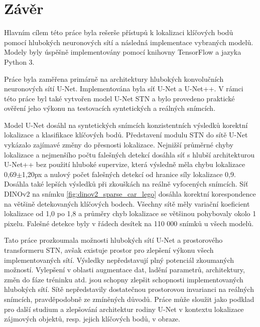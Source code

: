 \chapter{Závěr}
\label{sec:Chapter7}
Hlavním cílem této práce byla rešerše přístupů k lokalizaci klíčových bodů pomocí hlubokých neuronových sítí a následná implementace vybraných modelů. Modely byly úspěšně implementovány pomocí knihovny TensorFlow a jazyka Python 3.

Práce byla zaměřena primárně na architektury hlubokých konvolučních neuronových sítí U-Net. Implementována byla síť U-Net a U-Net++. V rámci této práce byl také vytvořen model U-Net STN a bylo provedeno praktické ověření jeho výkonu na testovacích syntetických a reálných snímcích.

Model U-Net dosáhl na syntetických snímcích konzistentních výsledků korektní lokalizace a klasifikace klíčových bodů. Představení modulu STN do sítě U-Net vykázalo zajímavé změny do přesnosti lokalizace. Nejnižší průměrné chyby lokalizace a nejmenšího počtu falešných detekcí dosáhla síť s hlubší architekturou U-Net++ bez použití hluboké supervize, která výsledně měla chybu lokalizace 0,69$\pm$1,20px a nulový počet falešných detekcí od hranice síly lokalizace 0,9. Dosáhla také lepších výsledků při zkouškách na reálně vyfocených snímcích. Síť DINOv2 na snímku \ref{fig:dinov2_sparse_car_lego} dosáhla korektní korespondence na většině detekovaných klíčových bodech. Všechny sítě měly variační koeficient lokalizace od 1,0 po 1,8 a průměry chyb lokalizace se většinou pohybovaly okolo 1 pixelu. Falešné detekce byly v řádech desítek na 110 000 snímků u všech modelů. 

Tato práce prozkoumala možnosti hlubokých sítí U-Net a prostorového transformeru STN, avšak existuje prostor pro zlepšení výkonu všech implementovaných sítí. Výsledky nepředstavují plný potenciál zkoumaných možností. Vylepšení v oblasti augmentace dat, ladění parametrů, architektury, změn do fáze tréninku atd. jsou schopny zlepšit schopnosti implementovaných hlubokých sítí. Sítě nepředstavily dostatečnou prostorovou invarianci na reálných snímcích, pravděpodobně ze zmíněných důvodů. Práce může sloužit jako podklad pro další studium a zlepšování architektur rodiny U-Net v kontextu lokalizace zájmových objektů, resp. jejich klíčových bodů, v obraze.
\endinput